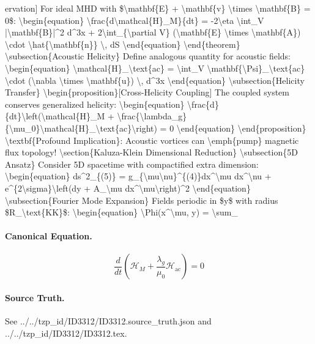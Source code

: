 ervation] For ideal MHD with \$\textbackslash{}mathbf\{E\} + \textbackslash{}mathbf\{v\} \textbackslash{}times \textbackslash{}mathbf\{B\} = 0\$: \textbackslash{}begin\{equation\} \textbackslash{}frac\{d\textbackslash{}mathcal\{H\}\_M\}\{dt\} = -2\textbackslash{}eta \textbackslash{}int\_V |\textbackslash{}mathbf\{B\}|\textasciicircum{}2 d\textasciicircum{}3x + 2\textbackslash{}int\_\{\textbackslash{}partial V\} (\textbackslash{}mathbf\{E\} \textbackslash{}times \textbackslash{}mathbf\{A\}) \textbackslash{}cdot \textbackslash{}hat\{\textbackslash{}mathbf\{n\}\} \textbackslash{}, dS \textbackslash{}end\{equation\} \textbackslash{}end\{theorem\} \textbackslash{}subsection\{Acoustic Helicity\} Define analogous quantity for acoustic fields: \textbackslash{}begin\{equation\} \textbackslash{}mathcal\{H\}\_\textbackslash{}text\{ac\} = \textbackslash{}int\_V \textbackslash{}mathbf\{\textbackslash{}Psi\}\_\textbackslash{}text\{ac\} \textbackslash{}cdot (\textbackslash{}nabla \textbackslash{}times \textbackslash{}mathbf\{u\}) \textbackslash{}, d\textasciicircum{}3x \textbackslash{}end\{equation\} \textbackslash{}subsection\{Helicity Transfer\} \textbackslash{}begin\{proposition\}[Cross-Helicity Coupling] The coupled system conserves generalized helicity: \textbackslash{}begin\{equation\} \textbackslash{}frac\{d\}\{dt\}\textbackslash{}left(\textbackslash{}mathcal\{H\}\_M + \textbackslash{}frac\{\textbackslash{}lambda\_g\}\{\textbackslash{}mu\_0\}\textbackslash{}mathcal\{H\}\_\textbackslash{}text\{ac\}\textbackslash{}right) = 0 \textbackslash{}end\{equation\} \textbackslash{}end\{proposition\} \textbackslash{}textbf\{Profound Implication\}: Acoustic vortices can \textbackslash{}emph\{pump\} magnetic flux topology! \textbackslash{}section\{Kaluza-Klein Dimensional Reduction\} \textbackslash{}subsection\{5D Ansatz\} Consider 5D spacetime with compactified extra dimension: \textbackslash{}begin\{equation\} ds\textasciicircum{}2\_\{(5)\} = g\_\{\textbackslash{}mu\textbackslash{}nu\}\textasciicircum{}\{(4)\}dx\textasciicircum{}\textbackslash{}mu dx\textasciicircum{}\textbackslash{}nu + e\textasciicircum{}\{2\textbackslash{}sigma\}\textbackslash{}left(dy + A\_\textbackslash{}mu dx\textasciicircum{}\textbackslash{}mu\textbackslash{}right)\textasciicircum{}2 \textbackslash{}end\{equation\} \textbackslash{}subsection\{Fourier Mode Expansion\} Fields periodic in \$y\$ with radius \$R\_\textbackslash{}text\{KK\}\$: \textbackslash{}begin\{equation\} \textbackslash{}Phi(x\textasciicircum{}\textbackslash{}mu, y) = \textbackslash{}sum\_

\paragraph{Canonical Equation.}
\[
\begin{equation} \frac{d}{dt} \left( \mathcal{H}_M + \frac{ \lambda_g}{ \mu_0} \mathcal{H}_ \text{ac} \right) = 0 \end{equation}
\]

\paragraph{Source Truth.}
See ../../tzp\_id/ID3312/ID3312.source\_truth.json and ../../tzp\_id/ID3312/ID3312.tex.
